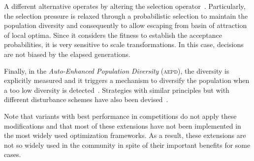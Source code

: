 A different alternative operates by altering the selection operator~\cite{sa2008exploration}.
%
Particularly, the selection pressure is relaxed through a probabilistic selection to maintain the population diversity and consequently 
to allow escaping from basin of attraction of local optima.
%
Since it considers the fitness to establish the acceptance probabilities, it is very sensitive to scale transformations.
%
In this case, decisions are not biased by the elapsed generations.

Finally, in the \textit{Auto-Enhanced Population Diversity} (\textsc{aepd}), the diversity is explicitly measured and it triggers a mechanism
to diversify the population when a too low diversity is detected~\cite{yang2015differential}.
%
Strategies with similar principles but with different disturbance schemes have also been devised~\cite{zhao2016differential}.

Note that \DE{} variants with best performance in competitions do not apply these modifications
and that most of these extensions have not been implemented in the most widely used optimization frameworks.
%
As a result, these extensions are not so widely used in the community in spite of their important benefits
for some cases.


